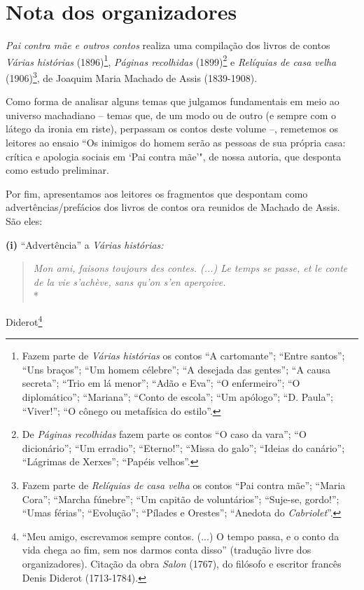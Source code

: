 
\chapter{Nota dos organizadores}

\emph{Pai contra mãe e outros contos} realiza uma compilação dos livros
de contos \emph{Várias histórias} (1896)\footnote{Fazem parte de
  \emph{Várias histórias} os contos ``A cartomante''; ``Entre santos'';
  ``Uns braços''; ``Um homem célebre''; ``A desejada das gentes''; ``A
  causa secreta''; ``Trio em lá menor''; ``Adão e Eva''; ``O
  enfermeiro''; ``O diplomático''; ``Mariana''; ``Conto de escola'';
  ``Um apólogo''; ``D. Paula''; ``Viver!''; ``O cônego ou metafísica do
  estilo''.}, \emph{Páginas recolhidas} (1899)\footnote{De \emph{Páginas
  recolhidas} fazem parte os contos ``O caso da vara''; ``O
  dicionário''; ``Um erradio''; ``Eterno!''; ``Missa do galo''; ``Ideias
  do canário''; ``Lágrimas de Xerxes''; ``Papéis velhos''.} e
\emph{Relíquias de casa velha} (1906)\footnote{Fazem parte de
  \emph{Relíquias de casa velha} os contos ``Pai contra mãe''; ``Maria
  Cora''; ``Marcha fúnebre''; ``Um capitão de voluntários''; ``Suje-se,
  gordo!''; ``Umas férias''; ``Evolução''; ``Pílades e Orestes'';
  ``Anedota do \emph{Cabriolet}''.}, de Joaquim Maria Machado de Assis
(1839-1908).

Como forma de analisar alguns temas que julgamos fundamentais em meio ao
universo machadiano -- temas que, de um modo ou de outro (e sempre com o
látego da ironia em riste), perpassam os contos deste volume --,
remetemos os leitores ao ensaio ``Os inimigos do homem serão as pessoas
de sua própria casa: crítica e apologia sociais em `Pai contra mãe'",
de nossa autoria, que desponta como estudo preliminar.

Por fim, apresentamos aos leitores os fragmentos que despontam como
advertências/prefácios dos livros de contos ora reunidos de Machado de
Assis. São eles:

\textbf{(i)} ``Advertência'' a \emph{Várias histórias: }

\begin{quote}
\emph{Mon ami, faisons toujours des contes. (...) Le temps se passe, et
le conte de la vie s'achève, sans qu'on s'en aperçoive. }\\*\end{quote}
\begin{flushright}Diderot\footnote{``Meu amigo, escrevamos sempre contos. (...) O tempo%
  passa, e o conto da vida chega ao fim, sem nos darmos conta disso''
  (tradução livre dos organizadores). Citação da obra \emph{Salon}
  (1767), do filósofo e escritor francês Denis Diderot (1713-1784).}\end{flushright}

